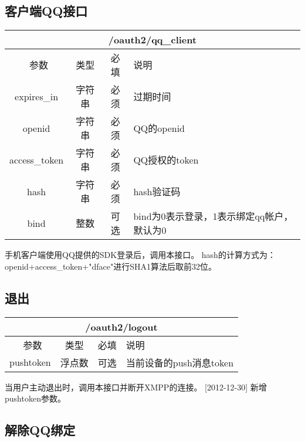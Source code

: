 \subsection{客户端QQ接口}
\label{hash_algorithm}

\begin{table}[H]
   \begin{center}
\begin{tabular}{|c|c|c|p{12cm}|}
\hline
\multicolumn{4}{|c|}{/oauth2/qq\_client} \\
\hline\hline
 \  参数  & 类型 & 必填 &  说明  \\
 \hline
 expires\_in  & 字符串 & 必须 &  过期时间\\
  \hline
 openid  & 字符串 & 必须 &  QQ的openid\\
  \hline
 access\_token  & 字符串 & 必须 &  QQ授权的token\\
 \hline
 hash  & 字符串 & 必须 &  hash验证码\\
 \hline
 bind  & 整数 & 可选 &  bind为0表示登录，1表示绑定qq帐户，默认为0\\
\hline
\end{tabular}
   \end{center}
\end{table}
手机客户端使用QQ提供的SDK登录后，调用本接口。
hash的计算方式为：openid+access\_token+"dface"进行SHA1算法后取前32位。


\subsection{退出}

\begin{table}[H]
   \begin{center}
\begin{tabular}{|c|c|c|p{12cm}|}
\hline
\multicolumn{4}{|c|}{/oauth2/logout} \\
\hline\hline
 \  参数  & 类型 & 必填 &  说明  \\
\hline
    pushtoken  & 浮点数 & 可选 &  当前设备的push消息token\\
\hline
\end{tabular}
   \end{center}
\end{table}

当用户主动退出时，调用本接口并断开XMPP的连接。
[2012-12-30] 新增pushtoken参数。


\subsection{解除QQ绑定}

